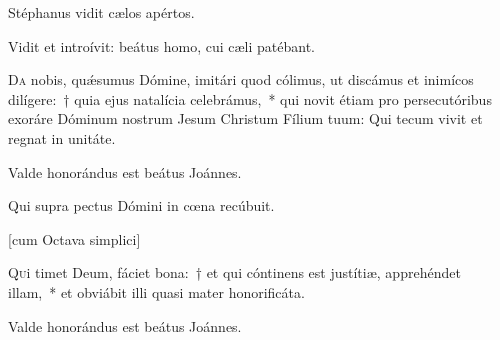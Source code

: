 \documentclass[vesperale_romanum.tex]{subfiles}
\begin{document}
\label{deus_tuorum_militum_nat} \hymnus


\vv Stéphanus vidit cælos apértos.

\rr Vidit et introívit: beátus homo, cui cæli patébant.

\label{an_sepelierunt_stephanum_solesmes}
\admagnificat


\oratio \label{oratio_s_stephani_dec_26}

\lettrine{D}{a} nobis, quǽsumus Dómine, imitári quod cólimus, ut discámus et inimícos dilígere:~† quia ejus natalícia celebrámus,~* qui novit étiam pro persecutóribus exoráre Dóminum nostrum Jesum Christum Fílium tuum: Qui tecum vivit et regnat in unitáte.

\label{an_iste_est_johannes_solesmes_1961} 
{}

\vv Valde honorándus est beátus Joánnes.

\rr Qui supra pectus Dómini in cœna recúbuit.




{} \label{dec_27}


[cum Octava simplici]


\lettrine{Q}{u}i timet Deum, fáciet bona:~† et qui cóntinens est justítiæ, apprehéndet illam,~* et obviábit illi quasi mater honorificáta.

\hymnus


\vv Valde honorándus est beátus Joánnes.
\end{document}
